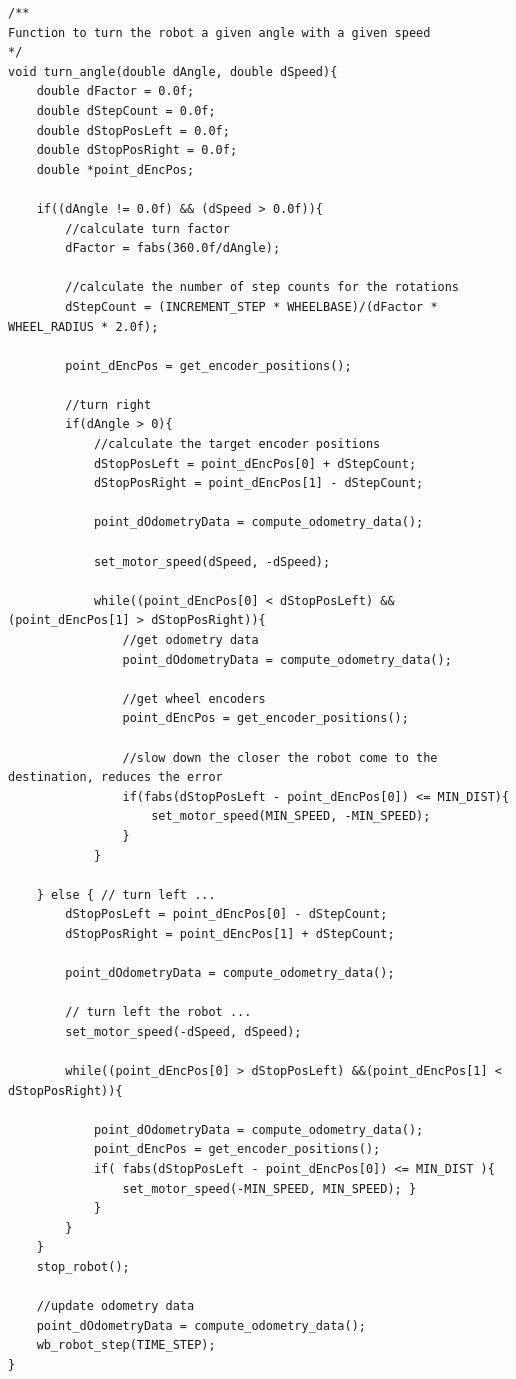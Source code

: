 \documentclass[10pt,a4paper]{article}
\begin{document}
\begin{flushleft}
\begin{lstlisting}
/**
Function to turn the robot a given angle with a given speed
*/
void turn_angle(double dAngle, double dSpeed){
	double dFactor = 0.0f;
	double dStepCount = 0.0f;
	double dStopPosLeft = 0.0f;
	double dStopPosRight = 0.0f;
	double *point_dEncPos;
	
	if((dAngle != 0.0f) && (dSpeed > 0.0f)){
		//calculate turn factor
		dFactor = fabs(360.0f/dAngle);
		
		//calculate the number of step counts for the rotations
		dStepCount = (INCREMENT_STEP * WHEELBASE)/(dFactor * WHEEL_RADIUS * 2.0f);
		
		point_dEncPos = get_encoder_positions();
		
		//turn right
		if(dAngle > 0){
			//calculate the target encoder positions
			dStopPosLeft = point_dEncPos[0] + dStepCount;
			dStopPosRight = point_dEncPos[1] - dStepCount;
			
			point_dOdometryData = compute_odometry_data();
			
			set_motor_speed(dSpeed, -dSpeed);
			
			while((point_dEncPos[0] < dStopPosLeft) && (point_dEncPos[1] > dStopPosRight)){
				//get odometry data
				point_dOdometryData = compute_odometry_data();
				
				//get wheel encoders
				point_dEncPos = get_encoder_positions();
				
				//slow down the closer the robot come to the destination, reduces the error
				if(fabs(dStopPosLeft - point_dEncPos[0]) <= MIN_DIST){
					set_motor_speed(MIN_SPEED, -MIN_SPEED);
				}
			}	
		
	} else { // turn left ...
		dStopPosLeft = point_dEncPos[0] - dStepCount;
		dStopPosRight = point_dEncPos[1] + dStepCount;
		
		point_dOdometryData = compute_odometry_data();

		// turn left the robot ...
		set_motor_speed(-dSpeed, dSpeed);

		while((point_dEncPos[0] > dStopPosLeft) &&(point_dEncPos[1] < dStopPosRight)){

			point_dOdometryData = compute_odometry_data();
			point_dEncPos = get_encoder_positions();
			if( fabs(dStopPosLeft - point_dEncPos[0]) <= MIN_DIST ){
				set_motor_speed(-MIN_SPEED, MIN_SPEED); }
			}
		}
	}
	stop_robot();
	
	//update odometry data
	point_dOdometryData = compute_odometry_data();
	wb_robot_step(TIME_STEP);
}
\end{lstlisting}


\end{flushleft}
\end{document}
